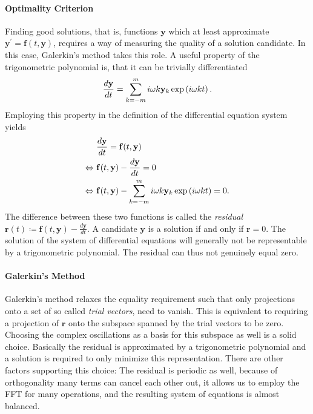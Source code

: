 \paragraph{Optimality Criterion} Finding good solutions, that is, functions $\mathbf{y}$ which at least approximate $\mathbf{y}^\prime = \mathbf{f}(t, \mathbf{y})$, requires a way of measuring the quality of a solution candidate.
In this case, Galerkin's method takes this role.
A useful property of the trigonometric polynomial is, that it can be trivially differentiated
	\begin{equation}
			\frac{d\mathbf{y}}{dt} = \sum_{k = -m}^m i \omega k \mathbf{y}_k \exp\left(i \omega k t\right) \text.
	\label{eq:trigondiff}
	\end{equation}
Employing this property in the definition of the differential equation system yields
	\begin{align*}
			& \frac{d\mathbf{y}}{dt} = \mathbf{f}(t,\mathbf{y})\\
		\Leftrightarrow\ & \mathbf{f}(t,\mathbf{y}) - \frac{d\mathbf{y}}{dt} = 0\\
		\Leftrightarrow\ & \mathbf{f}(t,\mathbf{y}) - \sum_{k = -m}^m i \omega k \mathbf{y}_k \exp\left(i \omega k t\right) = 0 \text.
	\end{align*}
The difference between these two functions is called the \emph{residual} $\mathbf{r}(t) \coloneqq \mathbf{f}(t,\mathbf{y}) - \frac{d\mathbf{y}}{dt}$.
A candidate $\mathbf y$ is a solution if and only if $\mathbf r = 0$.
The solution of the system of differential equations will generally not be representable by a trigonometric polynomial.
The residual can thus not genuinely equal zero.

\paragraph{Galerkin's Method} Galerkin's method relaxes the equality requirement such that only projections onto a set of so called \emph{trial vectors}, need to vanish.
This is equivalent to requiring a projection of $\mathbf{r}$ onto the subspace spanned by the trial vectors to be zero.
Choosing the complex oscillations as a basis for this subspace as well is a solid choice.
Basically the residual is approximated by a trigonometric polynomial and a solution is required to only minimize this representation.
There are other factors supporting this choice: The residual is periodic as well, because of orthogonality many terms can cancel each other out, it allows us to employ the FFT for many operations, and the resulting system of equations is almost balanced.

